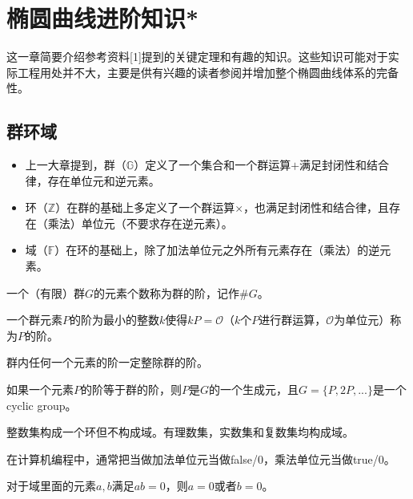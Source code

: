 \documentclass[12pt]{article}
\newcommand{\ec}{椭圆曲线}
\newcommand{\oo}{\mathcal{O}}
\begin{document}
\section{\ec 进阶知识*}
这一章简要介绍参考资料[1]提到的关键定理和有趣的知识。这些知识可能对于实际工程用处并不大，主要是供有兴趣的读者参阅并增加整个\ec 体系的完备性。
\subsection{群环域}
\begin{itemize}
\item 上一大章提到，群（$\mathbb{G}$）定义了一个集合和一个群运算$+$满足封闭性和结合律，存在单位元和逆元素。

\item 环（$\mathbb{Z}$）在群的基础上多定义了一个群运算$\times$，也满足封闭性和结合律，且存在（乘法）单位元（不要求存在逆元素）。

\item 域（$\mathbb{F}$）在环的基础上，除了加法单位元之外所有元素存在（乘法）的逆元素。
\end{itemize}
一个（有限）群$G$的元素个数称为群的阶，记作$\#G$。

一个群元素$P$的阶为最小的整数$k$使得$kP = \oo$（$k$个$P$进行群运算，$\oo$为单位元）称为$P$的阶。

群内任何一个元素的阶一定整除群的阶。

如果一个元素$P$的阶等于群的阶，则$P$是$G$的一个生成元，且$G=\{P,2P,...\}$是一个cyclic group。


整数集构成一个环但不构成域。有理数集，实数集和复数集均构成域。

在计算机编程中，通常把当做加法单位元当做false/0，乘法单位元当做true/0。

对于域里面的元素$a,b$满足$ab=0$，则$a=0$或者$b=0$。
\end{document}
